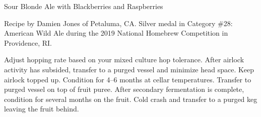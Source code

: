 \stylesection{\stylefruitbeer}

\begin{recipe}{Sour Blonde Ale with Blackberries and Raspberries}

\begin{aboutblock}
Recipe by Damien Jones of Petaluma, CA. Silver medal in Category \#28: American
Wild Ale during the 2019 National Homebrew Competition in Providence, RI.
\sourceaha
\end{aboutblock}


\begin{methodandtiming}
 
\begin{mashsteps}
\end{mashsteps}

\begin{fermentationsteps}
\end{fermentationsteps}

\begin{directions}
Adjust hopping rate based on your mixed culture hop tolerance. After airlock
activity has subsided, transfer to a purged vessel and minimize head space.
Keep airlock topped up. Condition for 4--6 months at cellar temperatures.
Transfer to purged vessel on top of fruit puree. After secondary fermentation
is complete, condition for several months on the fruit. Cold crash and transfer
to a purged keg leaving the fruit behind.
\end{directions}

\end{methodandtiming}

\recipebreak

\begin{ingredientsblock}

\begin{malts}
\end{malts}

\begin{hops}
\end{hops}


\begin{twists}
\end{twists}

\end{ingredientsblock}

\end{recipe}
